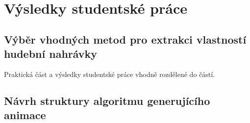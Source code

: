 \chapter{Výsledky studentské práce}

\section{Výběr vhodných metod pro extrakci vlastností hudební nahrávky}

Praktická část a výsledky studentské práce vhodně rozdělené do částí.

\section{Návrh struktury algoritmu generujícího animace}
